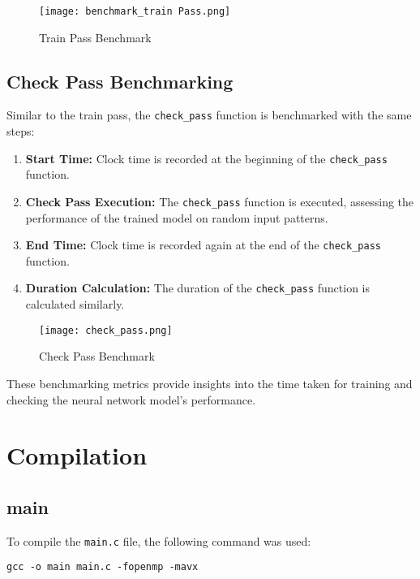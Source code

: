 \documentclass{article}
\begin{document}
\begin{figure}[h]
    \centering
    \texttt{[image: benchmark\_train Pass.png]}
    \caption{Train Pass Benchmark}
    \label{fig:enter-label}
\end{figure}

\subsection{Check Pass Benchmarking}
Similar to the train pass, the \texttt{check\_pass} function is benchmarked with the same steps:
\begin{enumerate}
    \item \textbf{Start Time:} Clock time is recorded at the beginning of the \texttt{check\_pass} function.
    
    \item \textbf{Check Pass Execution:} The \texttt{check\_pass} function is executed, assessing the performance of the trained model on random input patterns.
    
    \item \textbf{End Time:} Clock time is recorded again at the end of the \texttt{check\_pass} function.
    
    \item \textbf{Duration Calculation:} The duration of the \texttt{check\_pass} function is calculated similarly.
\end{enumerate}
\begin{figure}[h]
    \centering
    \texttt{[image: check\_pass.png]}
    \caption{Check Pass Benchmark}
    \label{fig:enter-label}
\end{figure}
These benchmarking metrics provide insights into the time taken for training and checking the neural network model's performance.

\section{Compilation}

\subsection{main}

To compile the \texttt{main.c} file, the following command was used:

\begin{verbatim}
gcc -o main main.c -fopenmp -mavx
\end{verbatim}
\end{document}

